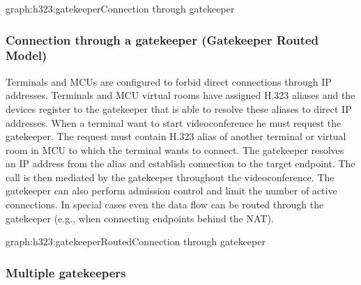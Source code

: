\documentclass[a4paper]{report}
\begin{document}
\begin{Graph}{graph:h323:gatekeeper}{Connection through gatekeeper}
  
  
\end{Graph}

\subsubsection{Connection through a gatekeeper (Gatekeeper Routed Model)}

Terminals and MCUs are configured to forbid direct connections through IP addresses. Terminals and MCU virtual rooms have assigned H.323 aliases and the devices register to the gatekeeper that is able to resolve these aliases to direct IP addresses. When a terminal want to start videoconference he must request the gatekeeper. The request must contain H.323 alias of another terminal or virtual room in MCU to which the terminal wants to connect. The gatekeeper resolves an IP address from the alias and establish connection to the target endpoint. The call is then mediated by the gatekeeper throughout the videoconference. The gatekeeper can also perform admission control and limit the number of active connections. In special cases even the data flow can be routed through the gatekeeper (e.g., when connecting endpoints behind the NAT).

\begin{Graph}{graph:h323:gatekeeperRouted}{Connection through gatekeeper}
  
  
\end{Graph}

\subsubsection{Multiple gatekeepers}
\end{document}
